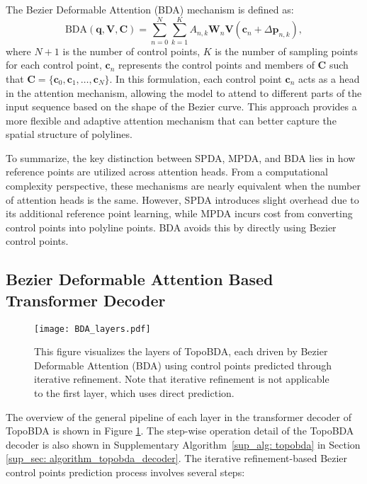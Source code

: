 The Bezier Deformable Attention (BDA) mechanism is defined as:
\begin{equation}
\text{BDA}(\mathbf{q}, \mathbf{V}, \mathbf{C} ) = \sum_{n=0}^{N} \sum_{k=1}^{K} A_{n,k} \mathbf{W}_n \mathbf{V}(\mathbf{c}_n + \Delta \mathbf{p}_{n,k}),
\end{equation}
where \( N+1 \) is the number of control points, \( K \) is the number of sampling points for each control point, \( \mathbf{c}_n \) represents the control points and members of $\mathbf{C}$ such that $\mathbf{C} = \{\mathbf{c}_0, \mathbf{c}_1, \ldots, \mathbf{c}_N\}$. In this formulation, each control point \( \mathbf{c}_n \) acts as a head in the attention mechanism, allowing the model to attend to different parts of the input sequence based on the shape of the Bezier curve. This approach provides a more flexible and adaptive attention mechanism that can better capture the spatial structure of polylines.

To summarize, the key distinction between SPDA, MPDA, and BDA lies in how reference points are utilized across attention heads. From a computational complexity perspective, these mechanisms are nearly equivalent when the number of attention heads is the same. However, SPDA introduces slight overhead due to its additional reference point learning, while MPDA incurs cost from converting control points into polyline points. BDA avoids this by directly using Bezier control points.


\subsection{Bezier Deformable Attention Based Transformer Decoder}
\label{sec: BDA_based_transformer_decoder}

\begin{figure}[tb]
  \centering
  \texttt{[image: BDA\_layers.pdf]}
  \caption{This figure visualizes the layers of TopoBDA, each driven by Bezier Deformable Attention (BDA) using control points predicted through iterative refinement. Note that iterative refinement is not applicable to the first layer, which uses direct prediction.}
  \label{fig: bezier_deformable_attention_detail}
\end{figure}

The overview of the general pipeline of each layer in the transformer decoder of TopoBDA is shown in Figure \ref{fig: bezier_deformable_attention_detail}. The step-wise operation detail of the TopoBDA decoder is also shown in Supplementary Algorithm~\ref{sup_alg: topobda} in Section \ref{sup_sec: algorithm_topobda_decoder}. The iterative refinement-based Bezier control points prediction process involves several steps:

